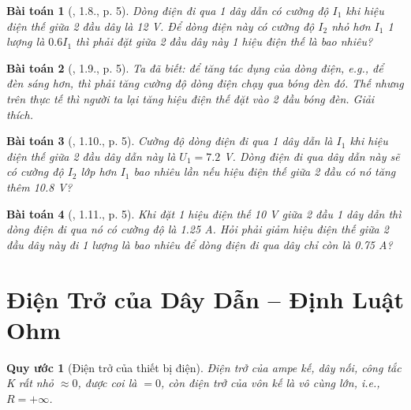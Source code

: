 \documentclass{article}
\newtheorem{baitoan}{Bài toán}
\newtheorem{quyuoc}{Quy ước}
\begin{document}
\begin{baitoan}[\cite{SBT_Vat_Ly_9}, 1.8., p. 5]
	Dòng điện đi qua 1 dây dẫn có cường độ $I_1$ khi hiệu điện thế giữa 2 đầu dây là \emph{12 V}. Để dòng điện này có cường độ $I_2$ nhỏ hơn $I_1$ 1 lượng là $0.6I_1$ thì phải đặt giữa 2 đầu dây này 1 hiệu điện thế là bao nhiêu?
\end{baitoan}

\begin{baitoan}[\cite{SBT_Vat_Ly_9}, 1.9., p. 5]
	Ta đã biết: để tăng tác dụng của dòng điện, e.g., để đèn sáng hơn, thì phải tăng cường độ dòng điện chạy qua bóng đèn đó. Thế nhưng trên thực tế thì người ta lại tăng hiệu điện thế đặt vào 2 đầu bóng đèn. Giải thích.
\end{baitoan}

\begin{baitoan}[\cite{SBT_Vat_Ly_9}, 1.10., p. 5]
	Cường độ dòng điện đi qua 1 dây dẫn là $I_1$ khi hiệu điện thế giữa 2 đầu dây dẫn này là $U_1 = 7.2$ \emph{V}. Dòng điện đi qua dây dẫn này sẽ có cường độ $I_2$ lớp hơn $I_1$ bao nhiêu lần nếu hiệu điện thế giữa 2 đầu có nó tăng thêm \emph{10.8 V}?
\end{baitoan}

\begin{baitoan}[\cite{SBT_Vat_Ly_9}, 1.11., p. 5]
	Khi đặt 1 hiệu điện thế \emph{10 V} giữa 2 đầu 1 dây dẫn thì dòng điện đi qua nó có cường độ là \emph{1.25 A}. Hỏi phải giảm hiệu điện thế giữa 2 đầu dây này đi 1 lượng là bao nhiêu để dòng điện đi qua dây chỉ còn là \emph{0.75 A}?
\end{baitoan}


\section{Điện Trở của Dây Dẫn -- Định Luật Ohm}

\begin{quyuoc}[Điện trở của thiết bị điện]
	Điện trở của ampe kế, dây nối, công tắc K rất nhỏ $\approx0$, được coi là $= 0$, còn điện trở của vôn kế là vô cùng lớn, i.e., $R = +\infty$.
\end{quyuoc}
\end{document}

